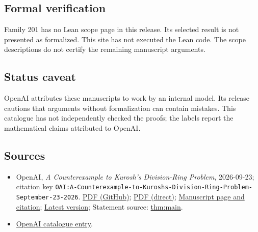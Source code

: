 \documentclass[11pt]{article}
\begin{document}
\subsection{Formal verification}
Family 201 has no Lean scope page in this release. Its selected result is not presented as formalized. This site has not executed the Lean code. The scope descriptions do not certify the remaining manuscript arguments.

\subsection{Status caveat}
OpenAI attributes these manuscripts to work by an internal model. Its release cautions that arguments without formalization can contain mistakes. This catalogue has not independently checked the proofs; the labels report the mathematical claims attributed to OpenAI.

\subsection{Sources}
\begin{itemize}
\item OpenAI, \emph{A Counterexample to Kurosh's Division-Ring Problem}, 2026-09-23; citation key \texttt{OAI:A-Counterexample-to-Kuroshs-Division-Ring-Problem-September-23-2026}. \href{https://github.com/openai/math/blob/adc7f1241b42e322a6451854ab7e4b4c146bf78a/preprints/A-Counterexample-to-Kuroshs-Division-Ring-Problem-September-23-2026/paper.pdf}{PDF (GitHub)}; \href{https://github.com/openai/math/raw/adc7f1241b42e322a6451854ab7e4b4c146bf78a/preprints/A-Counterexample-to-Kuroshs-Division-Ring-Problem-September-23-2026/paper.pdf}{PDF (direct)}; \href{https://github.com/openai/math/blob/adc7f1241b42e322a6451854ab7e4b4c146bf78a/preprints/A-Counterexample-to-Kuroshs-Division-Ring-Problem-September-23-2026/README.md}{Manuscript page and citation}; \href{https://github.com/openai/math/blob/main/preprints/A-Counterexample-to-Kuroshs-Division-Ring-Problem-September-23-2026/paper.pdf}{Latest version}; Statement source: \href{https://github.com/openai/math/blob/adc7f1241b42e322a6451854ab7e4b4c146bf78a/preprints/A-Counterexample-to-Kuroshs-Division-Ring-Problem-September-23-2026/build/sections/introduction.tex\#L19}{thm:main}.
\item \href{https://github.com/openai/math/blob/adc7f1241b42e322a6451854ab7e4b4c146bf78a/CONTENTS.md}{OpenAI catalogue entry}.
\end{itemize}
\end{document}
